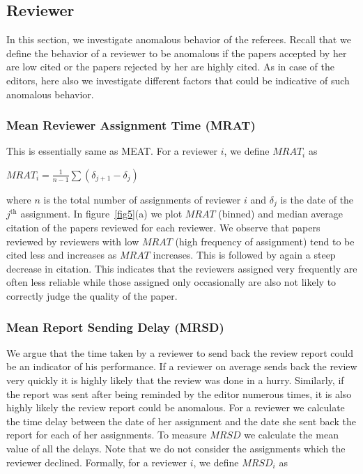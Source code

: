 \noindent
\subsection{Reviewer}
\label{reviewer}

In this section, we investigate anomalous behavior of the referees. Recall that we define the behavior of a reviewer to be anomalous if the papers accepted by her are low cited or the papers rejected by her are highly cited. As in case of the editors, here also we investigate different factors that could be indicative of such anomalous behavior.  

\subsubsection{Mean Reviewer Assignment Time (MRAT)}

This is essentially same as MEAT. For a reviewer $i$, we define $MRAT_{i}$ as
\begin{center}
$MRAT_{i}=\frac{1}{n-1}\sum (\delta_{j+1} - \delta_{j})$
\end{center}
\noindent where $n$ is the total number of assignments of reviewer $i$ and $\delta_{j}$ is the date of the $j^\textrm{th}$ assignment. In figure~\ref{fig5}(a) we plot $MRAT$ (binned) and median average citation of the papers reviewed for each reviewer. We observe that papers reviewed by reviewers with low $MRAT$ (high frequency of assignment) tend to be cited less and increases as $MRAT$ increases. This is followed by again a steep decrease in citation. This indicates that the reviewers assigned very frequently are often less reliable while those assigned only occasionally are also not likely to correctly judge the quality of the paper.  

\subsubsection{Mean Report Sending Delay (MRSD)}

We argue that the time taken by a reviewer to send back the review report could be an indicator of his performance. If a reviewer on average sends back the review very quickly it is highly likely that the review was done in a hurry. Similarly, if the report was sent after being reminded by the editor numerous times, it is also highly likely the review report could be anomalous. For a reviewer we calculate the time delay between the date of her assignment and the date she sent back the report for each of her assignments. To measure $MRSD$ we calculate the mean value of all the delays. Note that we do not consider the assignments which the reviewer declined. Formally, for a reviewer $i$, we define $MRSD_{i}$ as 

